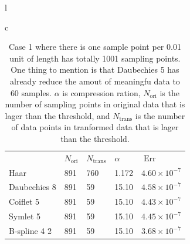 \documentclass{book}
\newcommand{\tmop}[1]{\ensuremath{\operatorname{#1}}}
\begin{document}
\begin{table}[h]
  \begin{tabular}{l}
    \begin{tabular}{c}
      \begin{tabular}{p{2.4cm}p{2.4cm}p{2.4cm}p{2.4cm}p{2.4cm}}
        \  & $N_{\tmop{ori}}$ & $N_{\tmop{trans}}$ & $\alpha$ & $\tmop{Err}$\\
        Haar & 891 & 760 & 1.172 & $4.60 \times 10^{- 7}$\\
        Daubechies 8 & 891 & 59 & 15.10 & $4.58 \times 10^{- 7}$\\
        Coiflet 5 & 891 & 59 & 15.10 & $4.43 \times 10^{- 7}$\\
        Symlet 5 & 891 & 59 & 15.10 & $4.45 \times 10^{- 7}$\\
        B-spline 4 2 & 891 & 59 & 15.10 & $3.68 \times 10^{- 7}$
      \end{tabular}
    \end{tabular}
  \end{tabular}
  \caption{\label{tab:compression02}\label{tab:compression02}Case 1 where
  there is one sample point per 0.01 unit of length has totally 1001 sampling
  points. One thing to mention is that Daubechies 5 has already reduce the
  amout of meaningfu data to 60 samples. $\alpha$ is compression ration,
  $N_{\tmop{ori}}$ is the number of sampling points in original data that is
  lager than the threshold, and $N_{\tmop{trans}}$ is the number of data
  points in tranformed data that is lager than the threshold.}
\end{table}
\end{document}
